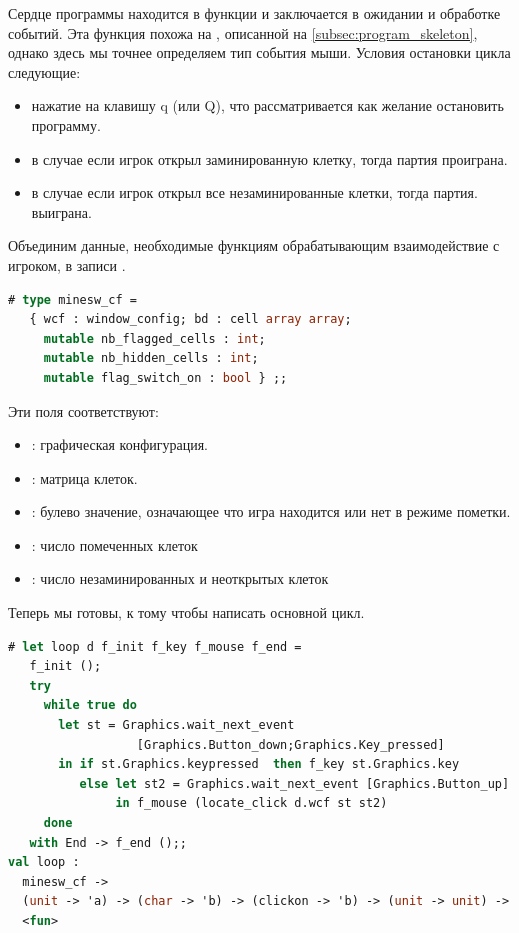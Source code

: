 Сердце программы находится в функции  и заключается в ожидании и
обработке событий. Эта функция похожа на , описанной на 
\ref{subsec:program_skeleton}, однако здесь мы точнее определяем тип события 
мыши. Условия остановки цикла следующие:

\begin{itemize}
	\item нажатие на клавишу q (или Q), что рассматривается как желание 
остановить программу.

	\item в случае если игрок открыл заминированную клетку, тогда партия 
проиграна.

	\item в случае если игрок открыл все незаминированные клетки, тогда партия. 
выиграна.
\end{itemize}

Объединим данные, необходимые функциям обрабатывающим взаимодействие с игроком, 
в записи .

\begin{lstlisting}[language=OCaml]
# type minesw_cf =
   { wcf : window_config; bd : cell array array;
     mutable nb_flagged_cells : int;
     mutable nb_hidden_cells : int;
     mutable flag_switch_on : bool } ;;
\end{lstlisting}

Эти поля соответствуют:

\begin{itemize}
	\item {}: графическая конфигурация.

	\item {}: матрица клеток.

	\item {}: булево значение, означающее что игра
находится или нет в режиме пометки.

	\item {}: число помеченных клеток

	\item {}: число незаминированных и неоткрытых клеток 
\end{itemize}

Теперь мы готовы, к тому чтобы написать основной цикл.

\begin{lstlisting}[language=OCaml]
# let loop d f_init f_key f_mouse f_end = 
   f_init ();
   try
     while true do 
       let st = Graphics.wait_next_event 
                  [Graphics.Button_down;Graphics.Key_pressed]  
       in if st.Graphics.keypressed  then f_key st.Graphics.key
          else let st2 = Graphics.wait_next_event [Graphics.Button_up] 
               in f_mouse (locate_click d.wcf st st2)
     done
   with End -> f_end ();;
val loop :
  minesw_cf ->
  (unit -> 'a) -> (char -> 'b) -> (clickon -> 'b) -> (unit -> unit) -> unit =
  <fun>
\end{lstlisting}

